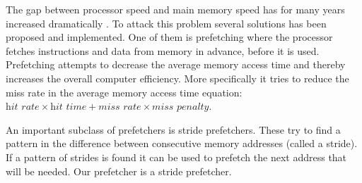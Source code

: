 The gap between processor speed and main memory speed has for many years increased dramatically 
\cite{mem_cpu_gap}. To attack this problem several solutions has been proposed and implemented. One
of them is prefetching where the processor fetches instructions and data from memory in advance,
before it is used.  Prefetching attempts to decrease the average memory access time and thereby
increases the overall computer efficiency. More specifically it tries to reduce the miss rate in the
average memory access time equation: $ \textit{hit rate} \times \textit{hit time} + \textit{miss
rate} \times \textit{miss penalty} $.


An important subclass of prefetchers is stride prefetchers. These try to find a pattern in the
difference between consecutive memory addresses (called a stride). If a pattern of strides is found
it can be used to prefetch the next address that will be needed. Our prefetcher is a stride
prefetcher.


